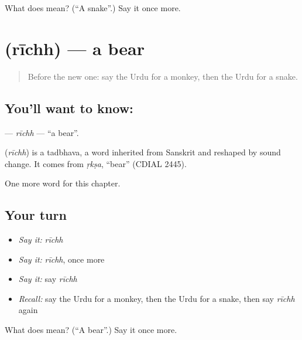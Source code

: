\begin{tcolorbox}[breakable,colback=teal!4,colframe=teal!35!black,title={Before you move on}]
What does  mean? (\textquotedblleft{}A snake\textquotedblright{}.) Say it once more.
\end{tcolorbox}
\section[\texorpdfstring{\ur{ریچھ} (rīchh)}{ریچھ (rīchh)}]{ (rīchh) — a bear}

\label{lesson:UR-C69-richh}



\begin{quote}
Before the new one: say the Urdu for a monkey, then the Urdu for a snake.
\end{quote}

\subsection*{You'll want to know: }
\textbf{} — \emph{rīchh} — \textquotedblleft{}a bear\textquotedblright{}.

\begin{cousinweb}
\textbf{} (\emph{rīchh}) is a tadbhava, a word inherited from Sanskrit and reshaped by sound change. It comes from \emph{ṛkṣa}, \textquotedblleft{}bear\textquotedblright{} (CDIAL 2445).
\end{cousinweb}

\begin{grammarlens}[title={What you've built}]
One more word for this chapter.
\end{grammarlens}

\subsection*{Your turn}
\begin{itemize}
\raggedright
  \item \emph{Say it:} \emph{rīchh}
  \item \emph{Say it:} \emph{rīchh}, once more
  \item \emph{Say it:} say \emph{rīchh}
  \item \emph{Recall:} say the Urdu for a monkey, then the Urdu for a snake, then say \emph{rīchh} again
\end{itemize}

\begin{tcolorbox}[breakable,colback=teal!4,colframe=teal!35!black,title={Before you move on}]
What does  mean? (\textquotedblleft{}A bear\textquotedblright{}.) Say it once more.
\end{tcolorbox}
